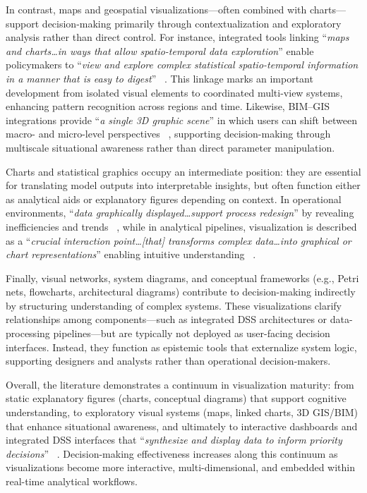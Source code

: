 \documentclass{sfuthesis}
\begin{document}
In contrast, maps and geospatial visualizations—often combined with charts—support decision-making primarily through contextualization and exploratory analysis rather than direct control. For instance, integrated tools linking “\textit{maps and charts…in ways that allow spatio-temporal data exploration}” enable policymakers to “\textit{view and explore complex statistical spatio-temporal information in a manner that is easy to digest}” ~\cite{chorev2017data}. This linkage marks an important development from isolated visual elements to coordinated multi-view systems, enhancing pattern recognition across regions and time. Likewise, BIM–GIS integrations provide “\textit{a single 3D graphic scene}” in which users can shift between macro- and micro-level perspectives ~\cite{Ma2020EquipmentMaintenance}, supporting decision-making through multiscale situational awareness rather than direct parameter manipulation.\par
Charts and statistical graphics occupy an intermediate position: they are essential for translating model outputs into interpretable insights, but often function either as analytical aids or explanatory figures depending on context. In operational environments, “\textit{data graphically displayed…support process redesign}” by revealing inefficiencies and trends ~\cite{Dahl2022PathologyLaboratories}, while in analytical pipelines, visualization is described as a “\textit{crucial interaction point…[that] transforms complex data…into graphical or chart representations}” enabling intuitive understanding ~\cite{song2024building}.\par
Finally, visual networks, system diagrams, and conceptual frameworks (e.g., Petri nets, flowcharts, architectural diagrams) contribute to decision-making indirectly by structuring understanding of complex systems. These visualizations clarify relationships among components—such as integrated DSS architectures or data-processing pipelines—but are typically not deployed as user-facing decision interfaces. Instead, they function as epistemic tools that externalize system logic, supporting designers and analysts rather than operational decision-makers.\par
Overall, the literature demonstrates a continuum in visualization maturity: from static explanatory figures (charts, conceptual diagrams) that support cognitive understanding, to exploratory visual systems (maps, linked charts, 3D GIS/BIM) that enhance situational awareness, and ultimately to interactive dashboards and integrated DSS interfaces that “\textit{synthesize and display data to inform priority decisions}” ~\cite{RiosZertuche2020ElectronicDecisionSupport}. Decision-making effectiveness increases along this continuum as visualizations become more interactive, multi-dimensional, and embedded within real-time analytical workflows. 
\end{document}
